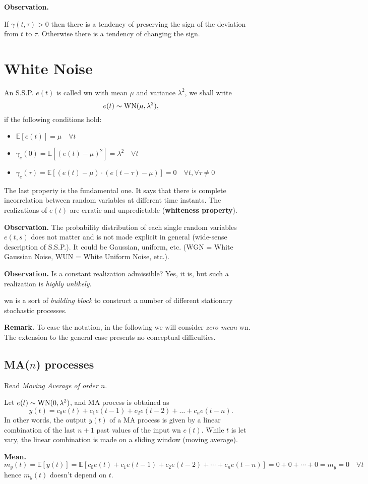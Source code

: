 \textbf{Observation.}

If $\gamma(t, \tau)>0$ then there is a tendency of preserving the sign of the deviation from $t$ to $\tau $. Otherwise there is a tendency of changing the sign.

\section{White Noise}

An S.S.P. $e(t)$ is called \gls{wn} with mean $\mu$ and variance $\lambda^{2}$, we shall write
\[
	e(t) \sim \operatorname{WN}(\mu, \lambda^{2}),
\]
if the following conditions hold:
\begin{itemize}
	\item $\mathbb{E}[e(t)]=\mu \quad \forall t$
	\item $\gamma_{e}(0)=\mathbb{E}[(e(t)-\mu)^{2}]=\lambda^{2} \quad \forall t$
	\item $\gamma_{e}(\tau)=\mathbb{E}[(e(t)-\mu) \cdot(e(t-\tau)-\mu)]=0 \quad \forall t, \forall \tau \neq 0$
\end{itemize}

The last property is the fundamental one. It says that there is complete incorrelation between random variables at different time instants. The realizations of $e(t)$ are erratic and unpredictable (\textbf{whiteness property}).


\textbf{Observation.} The probability distribution of each single random variables $e(t,s)$ does not matter and is not made explicit in general (wide-sense description of S.S.P.).
It could be Gaussian, uniform, etc. (WGN = White Gaussian Noise, WUN = White Uniform Noise, etc.).

\textbf{Observation.} Is a constant realization admissible? Yes, it is, but such a realization is \emph{highly unlikely}.

\gls{wn} is a sort of \emph{building block} to construct a number of different stationary stochastic processes.

\textbf{Remark.} To ease the notation, in the following we will consider \emph{zero mean} \gls{wn}. The extension to the general case presents no conceptual difficulties.

\subsection{MA(\texorpdfstring{$n$}{n}) processes}

Read \emph{Moving Average of order $n$}.

Let $e(t) \sim \operatorname{WN}(0, \lambda^{2})$, and MA process is obtained as
\[
	\boxed{y(t)=c_{0} e(t)+c_{1} e(t-1)+c_{2} e(t-2)+\ldots+c_{n} e(t-n).}
\]
In other words, the output $y(t)$ of a MA process is given by a linear combination of the last $n+1$ past values of the input \gls{wn} $e(t)$.
While $t$ is let vary, the linear combination is made on a sliding window (moving average).

\textbf{Mean.}
\[
	m_{y}(t)=\mathbb{E}[y(t)] = \mathbb{E}[c_{0} e(t)+c_{1} e(t-1)+c_{2} e(t-2)+\cdots+c_{n} e(t-n)] = 0+0+\cdots+0=m_{y}=0 \quad \forall t
\]
hence $m_{y}(t)$ doesn't depend on $t$.


